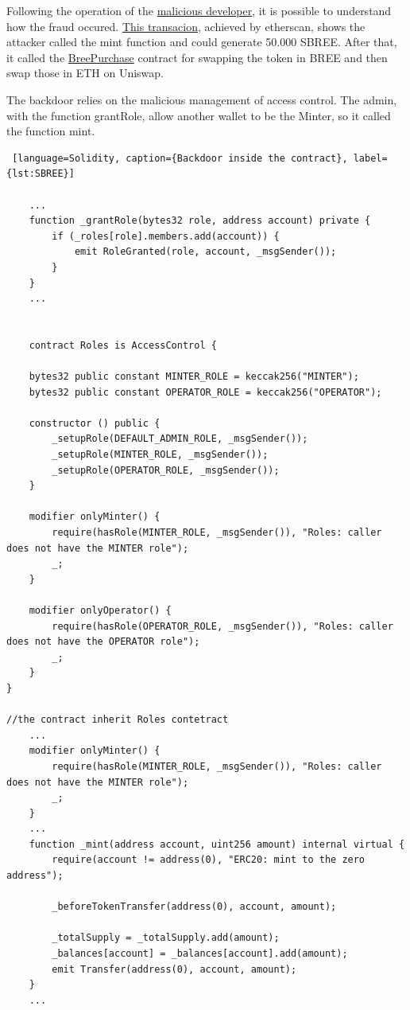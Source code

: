 Following the operation of the \href{https://etherscan.io/address/0x85c90f369676789d3234ecf07adb5262df1bcf15#tokentxns}{malicious developer}, it is possible to understand how the fraud occured.
\href{https://etherscan.io/tx/0x3bf7b06d6737e6d222234acc58dea634c7ff75e6cc447bece6cc264f2e1db9d2}{This transacion}, achieved by etherscan, shows the attacker called the mint function and could generate 
50.000 SBREE. After that, it called the \href{https://etherscan.io/address/0x60c3094a586b02cb416ec4df31119d4513ff0dde#code}{BreePurchase} 
contract for swapping the token in BREE and then swap those in ETH on Uniswap.

The backdoor relies on the malicious management of access control. The admin, with the function grantRole, allow another wallet to be the Minter, so it called the function mint.
\begin{lstlisting} [language=Solidity, caption={Backdoor inside the contract}, label={lst:SBREE}]
    
    ... 
    function _grantRole(bytes32 role, address account) private {
        if (_roles[role].members.add(account)) {
            emit RoleGranted(role, account, _msgSender());
        }
    }
    ... 


    contract Roles is AccessControl {

    bytes32 public constant MINTER_ROLE = keccak256("MINTER");
    bytes32 public constant OPERATOR_ROLE = keccak256("OPERATOR");

    constructor () public {
        _setupRole(DEFAULT_ADMIN_ROLE, _msgSender());
        _setupRole(MINTER_ROLE, _msgSender());
        _setupRole(OPERATOR_ROLE, _msgSender());
    }

    modifier onlyMinter() {
        require(hasRole(MINTER_ROLE, _msgSender()), "Roles: caller does not have the MINTER role");
        _;
    }

    modifier onlyOperator() {
        require(hasRole(OPERATOR_ROLE, _msgSender()), "Roles: caller does not have the OPERATOR role");
        _;
    }
}

//the contract inherit Roles contetract
    ... 
    modifier onlyMinter() {
        require(hasRole(MINTER_ROLE, _msgSender()), "Roles: caller does not have the MINTER role");
        _;
    }
    ... 
    function _mint(address account, uint256 amount) internal virtual {
        require(account != address(0), "ERC20: mint to the zero address");

        _beforeTokenTransfer(address(0), account, amount);

        _totalSupply = _totalSupply.add(amount);
        _balances[account] = _balances[account].add(amount);
        emit Transfer(address(0), account, amount);
    }
    ... 


\end{lstlisting} 
    
